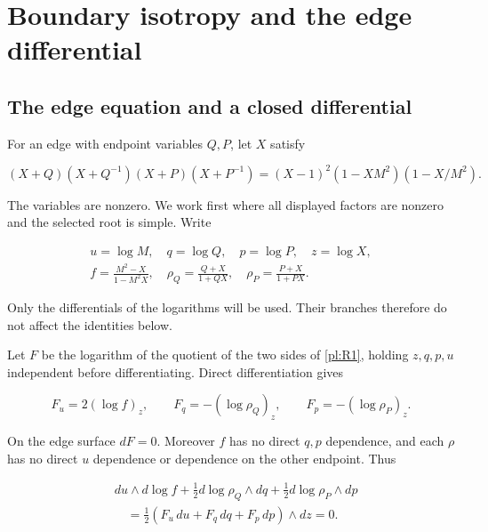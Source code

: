 \section{Boundary isotropy and the edge differential}\label{pl:boundary-isotropy-and-the-edge-differential}

\subsection{The edge equation and a closed differential}\label{pl:the-edge-equation-and-a-closed-differential}

For an edge with endpoint variables \(Q,P\), let \(X\) satisfy

\begin{equation}\label{pl:R1}
(X+Q)(X+Q^{-1})(X+P)(X+P^{-1})
      =(X-1)^2(1-XM^2)(1-X/M^2).
\end{equation}

The variables are nonzero. We work first where all displayed factors
are nonzero and the selected root is simple. Write

\begin{equation}\label{pl:R2}
\begin{gathered}
 u=\log M,\quad q=\log Q,\quad p=\log P,\quad z=\log X,\\
 f=\frac{M^2-X}{1-M^2X},\quad
 \rho_Q=\frac{Q+X}{1+QX},\quad
 \rho_P=\frac{P+X}{1+PX}.
 \end{gathered}
\end{equation}

Only the differentials of the logarithms will be used. Their branches
therefore do not affect the identities below.

Let \(F\) be the logarithm of the quotient of the two sides of
\eqref{pl:R1}, holding \(z,q,p,u\) independent before differentiating.
Direct differentiation gives

\begin{equation}\label{pl:R3}
F_u=2(\log f)_z,\qquad
 F_q=-(\log\rho_Q)_z,\qquad
 F_p=-(\log\rho_P)_z.
\end{equation}

On the edge surface \(dF=0\). Moreover \(f\) has no direct
\(q,p\) dependence, and each \(\rho\) has no direct
\(u\) dependence or dependence on the other endpoint. Thus

\begin{equation}\label{pl:R4}
\begin{aligned}
 &du\wedge d\log f+
   \tfrac12d\log\rho_Q\wedge dq+
   \tfrac12d\log\rho_P\wedge dp\\
 &\quad=\tfrac12(F_u\,du+F_q\,dq+F_p\,dp)\wedge dz=0.
 \end{aligned}
\end{equation}

